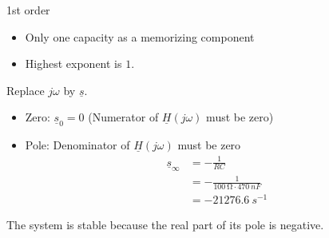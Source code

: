 \begin{solution}
	\begin{tasks}
		\task
		1st order
		\begin{itemize}
			\item Only one capacity as a memorizing component
			\item Highest exponent is $1$.
		\end{itemize}
	
		\task
		Replace $j \omega$ by $\underline{s}$.
		\begin{itemize}
			\item Zero: $\underline{s}_0 = 0$ (Numerator of $\underline{H}\left(j \omega\right)$ must be zero)
			\item Pole: Denominator of $\underline{H}\left(j \omega\right)$ must be zero
			\begin{equation*}
				\begin{split}
					\underline{s}_{\infty} &= -\frac{1}{RC} \\
					 &= -\frac{1}{\SI{100}{\ohm} \cdot \SI{470}{nF}} \\
					 &= \SI{-21276.6}{s^{-1}}
				\end{split}
			\end{equation*}
		\end{itemize}
		The system is stable because the real part of its pole is negative.
		
	\end{tasks}
\end{solution}
